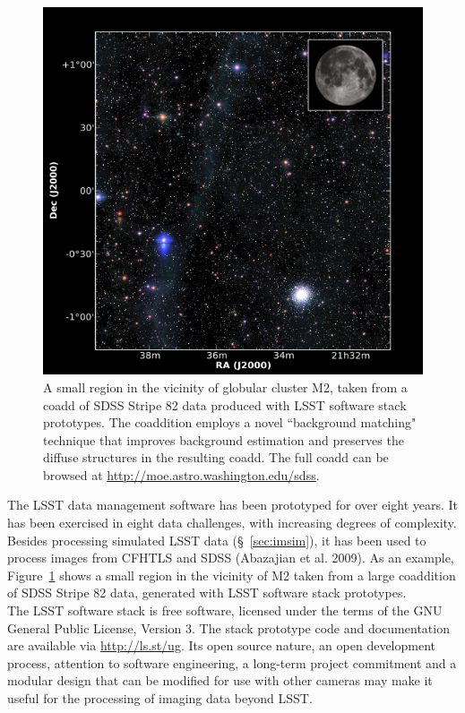 \begin{figure}
%
%
\includegraphics[width=1.0\hsize,clip]{DMStripe82.jpg}
\caption{
A small region in the vicinity of globular cluster M2, taken from a coadd of SDSS Stripe 82 data produced with LSST software stack prototypes. The coaddition employs a novel ``background matching" technique that improves background estimation and preserves the diffuse structures in the resulting coadd. The full coadd can be browsed at \url{http://moe.astro.washington.edu/sdss}.}
\label{Fig:DMStripe82}
\end{figure}


The LSST data management software has been prototyped for over eight
years. It has been exercised in eight data challenges, with increasing
degrees of complexity. Besides processing simulated LSST data
(\S~\ref{sec:imsim}), it has been used to process images from CFHTLS
and SDSS (Abazajian et al. 2009). As an example,
Figure~\ref{Fig:DMStripe82} shows a small region in the vicinity of M2
taken from a large coaddition of SDSS Stripe 82 data, generated with LSST
software stack prototypes.
\\

The LSST software stack is free software, licensed under the terms of the GNU General
Public License, Version 3. The stack
prototype code and documentation are available via \url{http://ls.st/ug}.
Its open source nature, an open development
process, attention to software engineering, a long-term project
commitment and a modular design that can be modified for use with
other cameras
may make it useful for the processing of imaging data beyond LSST.

